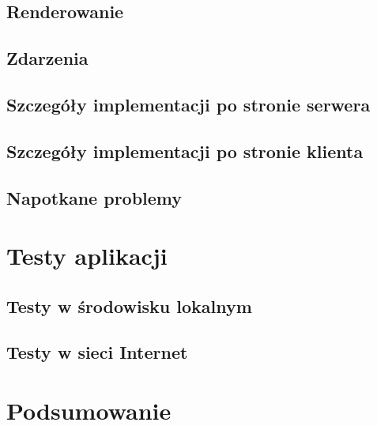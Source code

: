 \documentclass[polish]{inz}
\begin{document}
\section{Renderowanie}

\section{Zdarzenia}


\section{Szczegóły implementacji po stronie serwera}
\label{sec:implementation_server}


\section{Szczegóły implementacji po stronie klienta}


\section{Napotkane problemy}


\chapter{Testy aplikacji}


\section{Testy w środowisku lokalnym}


\section{Testy w sieci Internet}


\chapter{Podsumowanie}



\printindex
\end{document}
